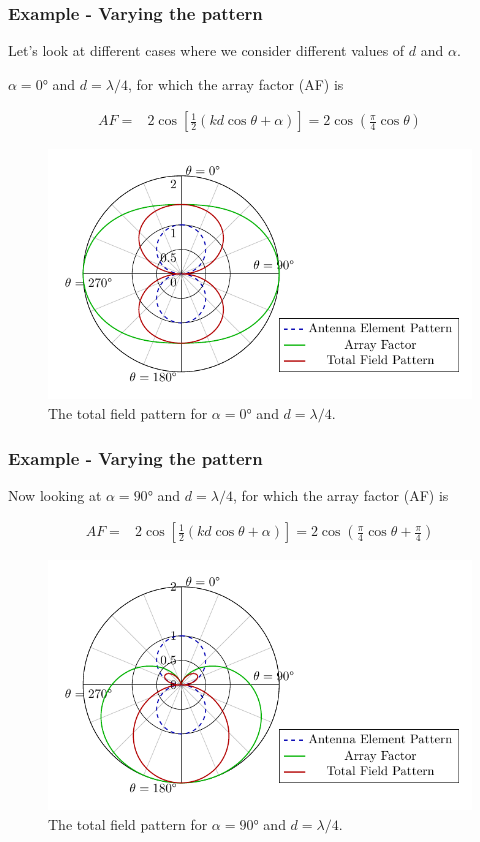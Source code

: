 \documentclass[10pt]{beamer}
\begin{document}
\begin{frame}
    \frametitle{Example - Varying the pattern}

    Let's look at different cases where we consider different values of $d$ and $\alpha$.
    \begin{outline}
        \1 $\alpha = \ang{0}$ and $d = \lambda/4$, for which the array factor (AF) is
    \end{outline}
    \small
    \begin{align*}
        AF {}=& 2 \cos \left[ \frac{1}{2} \left( k d \cos \theta + \alpha  \right) \right] = 2 \cos \left(\frac{\pi}{4}\cos \theta \right)
    \end{align*}
    \normalsize
\begin{figure}[T!]
    \centering
    \includegraphics[width=.55\textwidth]{total_pattern_d_quarter_alpha_0.pdf}
    \caption{The total field pattern for $\alpha = \ang{0}$ and $d = \lambda/4$.}
    \label{fig:antenna_array_quarter}
\end{figure} 
\end{frame}   

\begin{frame}
    \frametitle{Example - Varying the pattern}

    \begin{outline}
        \1 Now looking at $\alpha = \ang{90}$ and $d = \lambda/4$, for which the array factor (AF) is
    \end{outline}
    \small
    \begin{align*}
        AF {}=& 2 \cos \left[ \frac{1}{2} \left( k d \cos \theta + \alpha  \right) \right] = 2 \cos \left(\frac{\pi}{4}\cos \theta + \frac{\pi}{4}\right)
    \end{align*}
    \normalsize
\begin{figure}[T!]
    \centering
    \includegraphics[width=.55\textwidth]{total_pattern_d_quarter_alpha_90.pdf}
    \caption{The total field pattern for $\alpha = \ang{90}$ and $d = \lambda/4$.}
    \label{fig:antenna_array_quarter_90s}
\end{figure}  

\end{frame}
\end{document}
